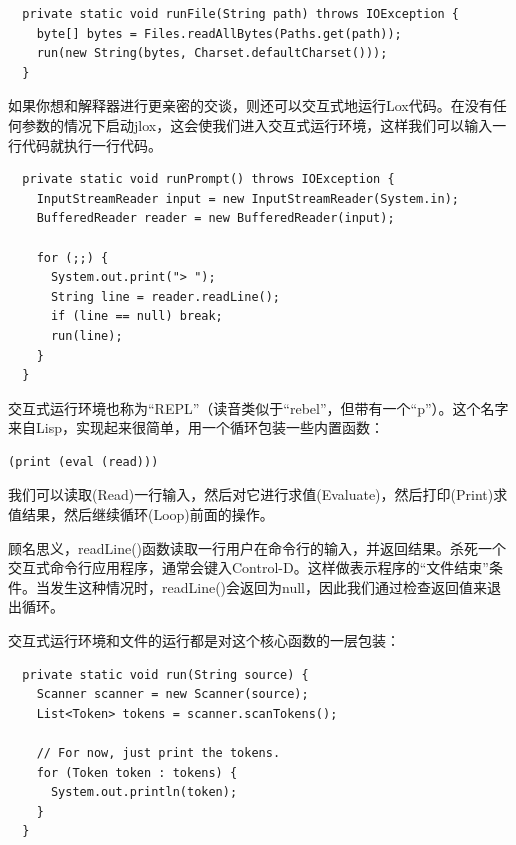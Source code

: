 \documentclass[cn,10pt,math=newtx,citestyle=gb7714-2015,bibstyle=gb7714-2015]{elegantbook}
\newenvironment{code}{\captionsetup{type=listing}}{}
\begin{document}
\begin{code}
\begin{verbatim}
  private static void runFile(String path) throws IOException {
    byte[] bytes = Files.readAllBytes(Paths.get(path));
    run(new String(bytes, Charset.defaultCharset()));
  }
\end{verbatim}
\end{code}

如果你想和解释器进行更亲密的交谈，则还可以交互式地运行Lox代码。在没有任何参数的情况下启动jlox，这会使我们进入交互式运行环境，这样我们可以输入一行代码就执行一行代码。

\begin{code}
\begin{verbatim}
  private static void runPrompt() throws IOException {
    InputStreamReader input = new InputStreamReader(System.in);
    BufferedReader reader = new BufferedReader(input);

    for (;;) { 
      System.out.print("> ");
      String line = reader.readLine();
      if (line == null) break;
      run(line);
    }
  }
\end{verbatim}
\end{code}

\begin{tcolorbox}
交互式运行环境也称为“REPL”（读音类似于“rebel”，但带有一个“p”）。这个名字来自Lisp，实现起来很简单，用一个循环包装一些内置函数：

\begin{verbatim}
(print (eval (read)))
\end{verbatim}

我们可以读取(Read)一行输入，然后对它进行求值(Evaluate)，然后打印(Print)求值结果，然后继续循环(Loop)前面的操作。
\end{tcolorbox}

顾名思义，readLine()函数读取一行用户在命令行的输入，并返回结果。杀死一个交互式命令行应用程序，通常会键入Control-D。这样做表示程序的“文件结束”条件。当发生这种情况时，readLine()会返回为null，因此我们通过检查返回值来退出循环。

交互式运行环境和文件的运行都是对这个核心函数的一层包装：

\begin{code}
\begin{verbatim}
  private static void run(String source) {
    Scanner scanner = new Scanner(source);
    List<Token> tokens = scanner.scanTokens();

    // For now, just print the tokens.
    for (Token token : tokens) {
      System.out.println(token);
    }
  }
\end{verbatim}
\end{code}
\end{document}
